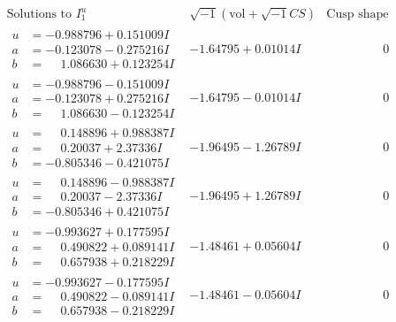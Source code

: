 \documentclass[1p]{elsarticle_modified}
\theoremstyle{definition}
\newcommand{\I}{\sqrt{-1}}
\begin{document}
$$\begin{array}{c|c|c}  
\text{Solutions to }I^u_{1}& \I (\text{vol} + \sqrt{-1}CS) & \text{Cusp shape}\\
 \hline 
\begin{aligned}
u &= -0.988796 + 0.151009 I \\
a &= -0.123078 - 0.275216 I \\
b &= \phantom{-}1.086630 + 0.123254 I\end{aligned}
 & -1.64795 + 0.01014 I & \phantom{-0.000000 } 0 \\ \hline\begin{aligned}
u &= -0.988796 - 0.151009 I \\
a &= -0.123078 + 0.275216 I \\
b &= \phantom{-}1.086630 - 0.123254 I\end{aligned}
 & -1.64795 - 0.01014 I & \phantom{-0.000000 } 0 \\ \hline\begin{aligned}
u &= \phantom{-}0.148896 + 0.988387 I \\
a &= \phantom{-}0.20037 + 2.37336 I \\
b &= -0.805346 - 0.421075 I\end{aligned}
 & -1.96495 - 1.26789 I & \phantom{-0.000000 } 0 \\ \hline\begin{aligned}
u &= \phantom{-}0.148896 - 0.988387 I \\
a &= \phantom{-}0.20037 - 2.37336 I \\
b &= -0.805346 + 0.421075 I\end{aligned}
 & -1.96495 + 1.26789 I & \phantom{-0.000000 } 0 \\ \hline\begin{aligned}
u &= -0.993627 + 0.177595 I \\
a &= \phantom{-}0.490822 + 0.089141 I \\
b &= \phantom{-}0.657938 + 0.218229 I\end{aligned}
 & -1.48461 + 0.05604 I & \phantom{-0.000000 } 0 \\ \hline\begin{aligned}
u &= -0.993627 - 0.177595 I \\
a &= \phantom{-}0.490822 - 0.089141 I \\
b &= \phantom{-}0.657938 - 0.218229 I\end{aligned}
 & -1.48461 - 0.05604 I & \phantom{-0.000000 } 0 \\ \hline\begin{aligned}

\end{aligned}
\end{array}$$
\end{document}
